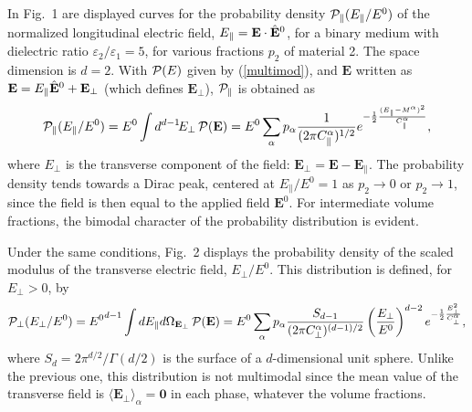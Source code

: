 In Fig.\ 1 are displayed curves for the probability density
${\cal{P}}_\parallel(E_\parallel/E^0)$
of the normalized longitudinal electric field,
$E_\parallel={\bf E}\cdot \hat{\bf E}^0$,
for a binary medium with dielectric ratio
$\varepsilon_2/\varepsilon_1=5$,
for various fractions $p_2$
of material 2. The space dimension is $d=2$.
With ${\cal{P}}(E)$ given by (\ref{multimod}), and
${\mathbf E}$ written as
${\mathbf E}= E_\parallel\hat{\bf E}^0+{\mathbf E}_\perp$
(which defines ${\mathbf E}_\perp$),
${\cal{P}}_\parallel$ is obtained as
\begin{equation}
{\cal{P}}_\parallel(E_\parallel/E^0)
=E^0\int d^{d-1}\! E_\perp\,
{\cal{P}}({\mathbf E})
=E^0 \sum_\alpha p_\alpha
\frac{1}{(2\pi C^\alpha_\parallel)^{1/2}}
e^{-\frac{1}{2} \frac{(E_\parallel-M^\alpha)^2}{C^\alpha_\parallel}},
\end{equation}
where $E_\perp$ is the transverse component of the field:
${\mathbf{E}}_\perp={\mathbf{E}}-{\mathbf{E}}_\parallel$.
The probability density tends towards a Dirac peak, centered
at $E_\parallel/E^0=1$ as $p_2\to 0$ or $p_2\to 1$, since
the field is then equal to the applied field ${\mathbf E}^0$.
For intermediate volume fractions, the bimodal character of
the probability distribution is evident.

Under the same conditions, Fig.\ 2 displays the probability
density of the scaled modulus of the transverse electric field,
$E_\perp/E^0$. This distribution is defined, for $E_\perp>0$,
by
\begin{equation}
{\cal{P}}_\perp(E_\perp/E^0)={E^0}^{d-1}\int dE_\parallel
d\Omega_{{\mathbf E}_\perp}\, {\cal{P}}({\mathbf E})=
E^0 \sum_\alpha p_\alpha \frac{S_{d-1}}
{(2\pi C^\alpha_\perp)^{(d-1)/2}}\left(\frac{E_\perp}
{E^0}\right)^{d-2}e^{-\frac{1}{2} \frac{E_\perp^2} {C^\alpha_\perp}},
\end{equation}
where $S_d=2\pi^{d/2}/\Gamma(d/2)$ is the surface of a
$d$-dimensional unit sphere. Unlike the previous one,
this distribution is not multimodal since the mean value
of the transverse field is $\langle{\mathbf E}_\perp\rangle_\alpha
={\mathbf 0}$ in each phase, whatever the volume fractions.

